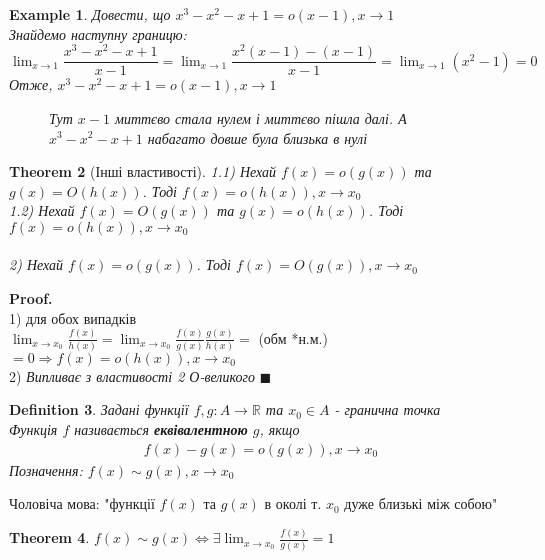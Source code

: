 \documentclass[a4paper, 14pt]{extarticle}
\def\huge{\displaystyle}
\def\bigline{\vspace{5mm}\\}
\theoremstyle{theoremdd}
\newtheorem{theorem}{Theorem}[subsection]
\theoremstyle{theoremdd}
\newtheorem{definition}[theorem]{Definition}
\theoremstyle{theoremdd}
\theoremstyle{theoremdd}
\newtheorem{example}[theorem]{Example}
\theoremstyle{theoremdd}
\theoremstyle{theoremdd}
\theoremstyle{theoremdd}
\theoremstyle{theoremdd}
\newenvironment{pf}{\vspace*{-3mm} \textbf{Proof. \\}}{$\blacksquare$}
\begin{document}
\begin{example}
Довести, що $x^3 - x^2 - x + 1 = o(x-1), x \to 1$\\
Знайдемо наступну границю:\\
$\huge \lim_{x \to 1} \dfrac{x^3-x^2-x+1}{x-1} = \lim_{x \to 1} \dfrac{x^2(x-1)-(x-1)}{x-1} = \lim_{x \to 1} (x^2-1) = 0$\\
Отже, $x^3 - x^2 - x + 1 = o(x-1), x \to 1$
\begin{figure} [H]
\centering
{
\caption*{Тут $x-1$ миттєво стала нулем і миттєво пішла далі. А $x^3-x^2-x+1$ набагато довше була близька в нулі}
}
\end{figure}
\end{example}

\begin{theorem}[Інші властивості]
1.1) Нехай $f(x) = o(g(x))$ та $g(x) = O(h(x))$. Тоді $f(x) = o(h(x)), x \to x_0$\\
1.2) Нехай $f(x) = O(g(x))$ та $g(x) = o(h(x))$. Тоді $f(x) = o(h(x)), x \to x_0$\\
\\
2) Нехай $f(x) = o(g(x))$. Тоді $f(x) = O(g(x)), x \to x_0$
\end{theorem}

\begin{pf}
1) для обох випадків\\
$\huge \lim_{x \to x_0} \frac{f(x)}{h(x)} = \lim_{x \to x_0} \frac{f(x)}{g(x)} \frac{g(x)}{h(x)} =$ (обм *н.м.) $= 0 \Rightarrow f(x) = o(h(x)), x \to x_0$
\bigline
2) \textit{Випливає з властивості 2 О-великого}
\end{pf}

\begin{definition}
Задані функції $f,g: A \to \mathbb{R}$ та $x_0 \in A$ - гранична точка\\
Функція $f$ називається \textbf{еквівалентною} $g$, якщо
\begin{align*}
f(x) - g(x) = o(g(x)), x \to x_0
\end{align*}
Позначення: $f(x) \sim g(x), x \to x_0$
\end{definition}
Чоловіча мова: "функції $f(x)$ та $g(x)$ в околі т. $x_0$ дуже близькі між собою"
\bigline
\begin{theorem}
$f(x) \sim g(x) \iff \huge \exists \lim_{x \to x_0} \frac{f(x)}{g(x)} = 1$
\end{theorem}
\end{document}
